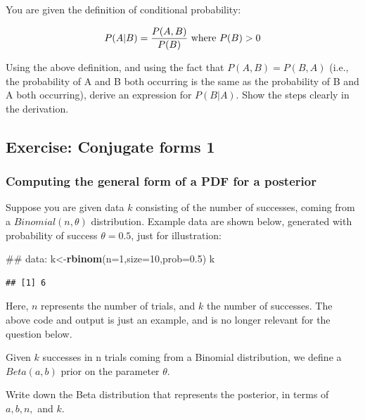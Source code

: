 \documentclass[12pt,]{krantz}
\newenvironment{Shaded}{\begin{snugshade}}{\end{snugshade}}
\newcommand{\KeywordTok}[1]{\textcolor[rgb]{0.13,0.29,0.53}{\textbf{#1}}}
\newcommand{\DataTypeTok}[1]{\textcolor[rgb]{0.13,0.29,0.53}{#1}}
\newcommand{\DecValTok}[1]{\textcolor[rgb]{0.00,0.00,0.81}{#1}}
\newcommand{\FloatTok}[1]{\textcolor[rgb]{0.00,0.00,0.81}{#1}}
\newcommand{\NormalTok}[1]{#1}
\theoremstyle{definition}
\theoremstyle{definition}
\theoremstyle{definition}
\theoremstyle{remark}
\begin{document}
You are given the definition of conditional probability:

\begin{equation}
P(A|B)= \frac{P(A,B)}{P(B)} \hbox{ where } P(B)>0
\end{equation}

Using the above definition, and using the fact that \(P(A,B)=P(B,A)\)
(i.e., the probability of A and B both occurring is the same as the
probability of B and A both occurring), derive an expression for
\(P(B|A)\). Show the steps clearly in the derivation.

\subsection{Exercise: Conjugate forms
1}\label{exercise-conjugate-forms-1}

\subsubsection{Computing the general form of a PDF for a
posterior}\label{computing-the-general-form-of-a-pdf-for-a-posterior}

Suppose you are given data \(k\) consisting of the number of successes,
coming from a \(Binomial(n,\theta)\) distribution. Example data are
shown below, generated with probability of success \(\theta=0.5\), just
for illustration:

\begin{Shaded}
\begin{Highlighting}[]
\NormalTok{## data:}
\NormalTok{k<-}\KeywordTok{rbinom}\NormalTok{(}\DataTypeTok{n=}\DecValTok{1}\NormalTok{,}\DataTypeTok{size=}\DecValTok{10}\NormalTok{,}\DataTypeTok{prob=}\FloatTok{0.5}\NormalTok{)}
\NormalTok{k}
\end{Highlighting}
\end{Shaded}

\begin{verbatim}
## [1] 6
\end{verbatim}

Here, \(n\) represents the number of trials, and \(k\) the number of
successes. The above code and output is just an example, and is no
longer relevant for the question below.

Given \(k\) successes in n trials coming from a Binomial distribution,
we define a \(Beta(a,b)\) prior on the parameter \(\theta\).

Write down the Beta distribution that represents the posterior, in terms
of \(a,b, n,\) and \(k\).
\end{document}
